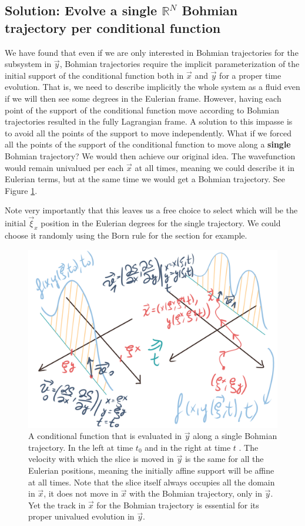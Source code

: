 \documentclass[11pt, a4paper]{article} %
\newcommand{\R}{\mathbb{R}} %
\DeclareRobustCommand{\mybox}[2][gray!10]{%
\begin{tcolorbox}[   %
        left=0.2cm,
        right=0.2cm,
        top=0.15cm,
        bottom=0.15cm,
        colback=#1,
        colframe=#1,
        width=\dimexpr\textwidth\relax, 
        enlarge left by=0mm,
        boxsep=5pt,
        arc=0pt,outer arc=0pt,
        ]
        #2
\end{tcolorbox}
}
\begin{document}
\mybox{
\subsection*{Solution: Evolve a single $\R^N$ Bohmian trajectory per conditional function}
We have found that even if we are only interested in Bohmian trajectories for the subsystem in $\vec{y}$, Bohmian trajectories require the implicit parameterization of the initial support of the conditional function both in $\vec{x}$ and $\vec{y}$ for a proper time evolution. That is, we need to describe implicitly the whole system as a fluid even if we will then see some degrees in the Eulerian frame. However, having each point of the support of the conditional function move according to Bohmian trajectories resulted in the fully Lagrangian frame. A solution to this impasse is to avoid all the points of the support to move independently. What if we forced all the points of the support of the conditional function to move along a {\bf single} Bohmian trajectory? We would then achieve our original idea. The wavefunction would remain univalued per each $\vec{x}$ at all times, meaning we could describe it in Eulerian terms, but at the same time we would get a Bohmian trajectory. See Figure \ref{fig:singleTraj}. 

Note very importantly that this leaves us a free choice to select which will be the initial $\vec{\xi}_x$ position in the Eulerian degrees for the single trajectory. We could choose it randomly using the Born rule for the section for example.

}
\begin{figure}[h!]
  \centering
    \includegraphics[width=0.64\linewidth]{moving_bohmian.png}
  \caption{A conditional function that is evaluated in $\vec{y}$ along a single Bohmian trajectory. In the left at time $t_0$ and in the right at time $t$ . The velocity with which the slice is moved in $\vec{y}$ is the same for all the Eulerian positions, meaning the initially affine support will be affine at all times. Note that the slice itself always occupies all the domain in $\vec{x}$, it does not move in $\vec{x}$ with the Bohmian trajectory, only in $\vec{y}$. Yet the track in $\vec{x}$ for the Bohmian trajectory is essential for its proper univalued evolution in $\vec{y}$. }
  \label{fig:singleTraj}
\end{figure}
\end{document}
